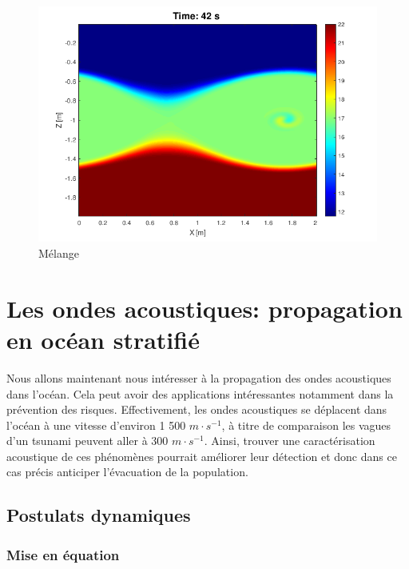 \documentclass{rapportECC}
\begin{document}
\begin{figure}[htbp]
\begin{minipage}{0.45\textwidth}
        \includegraphics[width=\linewidth]{images/KHI4.png}
        \caption{Mélange}
        \label{fig:KHI4}
    \end{minipage}
\end{figure}








\section{Les ondes acoustiques: propagation en océan stratifié}

Nous allons maintenant nous intéresser à la propagation des ondes acoustiques dans l'océan. Cela peut avoir des applications intéressantes notamment dans la prévention des risques. Effectivement, les ondes acoustiques se déplacent dans l'océan à une vitesse d'environ 1 500 $m \cdot s^{-1}$, à titre de comparaison les vagues d'un tsunami peuvent aller à 300 $m \cdot s^{-1}$. Ainsi, trouver une caractérisation acoustique de ces phénomènes pourrait améliorer leur détection et donc dans ce cas précis anticiper l'évacuation de la population.

\subsection{Postulats dynamiques}
\subsubsection{Mise en équation}
\end{document}
